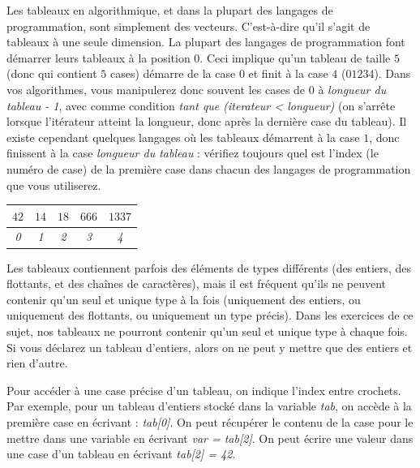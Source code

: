 \documentclass[11pt,a4paper]{article}
\begin{document}
Les tableaux en algorithmique, et dans la plupart des langages de programmation, sont simplement des vecteurs.
C'est-à-dire qu'il s'agit de tableaux à une seule dimension.
La plupart des langages de programmation font démarrer leurs tableaux à la position $ 0 $.
Ceci implique qu'un tableau de taille $ 5 $ (donc qui contient $ 5 $ cases) démarre de la case $ 0 $ et finit à la case $ 4 $ ($ 0 1 2 3 4 $).
Dans vos algorithmes, vous manipulerez donc souvent les cases de $ 0 $ à \textit{longueur du tableau - 1}, avec comme condition \textit{tant que (iterateur < longueur)} (on s'arrête lorsque l'itérateur atteint la longueur, donc après la dernière case du tableau).
Il existe cependant quelques langages où les tableaux démarrent à la case $ 1 $, donc finissent à la case \textit{longueur du tableau} : vérifiez toujours quel est l'index (le numéro de case) de la première case dans chacun des langages de programmation que vous utiliserez.

\medskip

\begin{table}[h!]
  \centering
  \begin{tabular}{| c | c | c | c | c |}
  \hline
$ 42 $ & $ 14 $ & $ 18 $ & $ 666 $ & $ 1337 $ \\
  \hline
\textit{0} & \textit{1} & \textit{2} & \textit{3} & \textit{4} \\
  \hline
  \end{tabular}
\end{table}

\medskip

Les tableaux contiennent parfois des éléments de types différents (des entiers, des flottants, et des chaînes de caractères), mais il est fréquent qu'ils ne peuvent contenir qu'un seul et unique type à la fois (uniquement des entiers, ou uniquement des flottants, ou uniquement un type précis).
Dans les exercices de ce sujet, nos tableaux ne pourront contenir qu'un seul et unique type à chaque fois.
Si vous déclarez un tableau d'entiers, alors on ne peut y mettre que des entiers et rien d'autre.

\bigskip

Pour accéder à une case précise d'un tableau, on indique l'index entre crochets.
Par exemple, pour un tableau d'entiers stocké dans la variable \textit{tab}, on accède à la première case en écrivant : \textit{tab[0]}.
On peut récupérer le contenu de la case pour le mettre dans une variable en écrivant \textit{var = tab[2]}.
On peut écrire une valeur dans une case d'un tableau en écrivant \textit{tab[2] = 42}.
\end{document}
